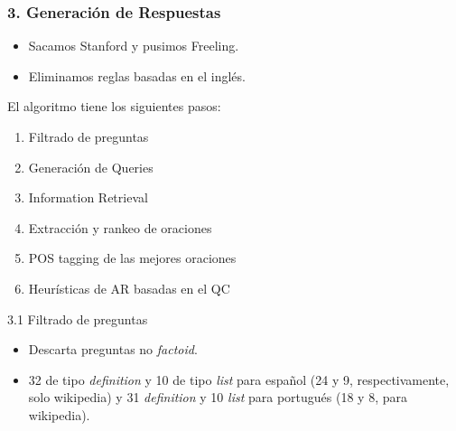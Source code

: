 \begin{frame}
\frametitle{3. Generación de Respuestas}
  \begin{itemize}
    \item Sacamos Stanford y pusimos Freeling. 
    \item Eliminamos reglas basadas en el inglés.
  \end{itemize}
  El algoritmo tiene los siguientes pasos:
  \begin{enumerate}
    \item Filtrado de preguntas
    \item Generación de Queries
    \item Information Retrieval
    \item Extracción y rankeo de oraciones
    \item POS tagging de las mejores oraciones
    \item Heurísticas de AR basadas en el QC
  \end{enumerate}
  \begin{block}{3.1 Filtrado de preguntas}
  \begin{itemize}
      \item Descarta preguntas no \textit{factoid}.
      \item 32 de tipo \textit{definition} y 10 de tipo \textit{list} para español (24 y 9, respectivamente, solo wikipedia) y 31 \textit{definition} y 10 \textit{list} para portugués (18 y 8, para wikipedia).
    \end{itemize}
  \end{block}
\end{frame}

